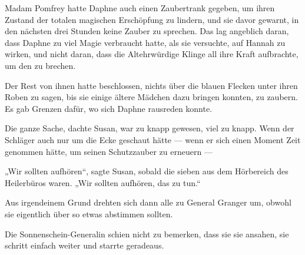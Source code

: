 Madam Pomfrey hatte Daphne auch einen Zaubertrank gegeben, um ihren Zustand der totalen magischen Erschöpfung zu lindern, und sie davor gewarnt, in den nächsten drei Stunden keine Zauber zu sprechen. Das lag angeblich daran, dass Daphne zu viel Magie verbraucht hatte, als sie versuchte,  auf Hannah zu wirken, und nicht daran, dass die Altehrwürdige Klinge all ihre Kraft aufbrachte, um den  zu brechen.

Der Rest von ihnen hatte beschlossen, nichts über die blauen Flecken unter ihren Roben zu sagen, bis sie einige ältere Mädchen dazu bringen konnten,  zu zaubern. Es gab Grenzen dafür, wo sich Daphne rausreden konnte.

Die ganze Sache, dachte Susan, war zu knapp gewesen, viel zu knapp. Wenn der Schläger auch nur um die Ecke geschaut hätte — wenn er sich einen Moment Zeit genommen hätte, um seinen Schutzzauber zu erneuern —

„Wir sollten aufhören“, sagte Susan, sobald die sieben aus dem Hörbereich des Heilerbüros waren.
„Wir sollten aufhören, das zu tun.“

Aus irgendeinem Grund drehten sich dann alle zu General Granger um, obwohl sie eigentlich über so etwas abstimmen sollten.

Die Sonnenschein-Generalin schien nicht zu bemerken, dass sie sie ansahen, sie schritt einfach weiter und starrte geradeaus.


